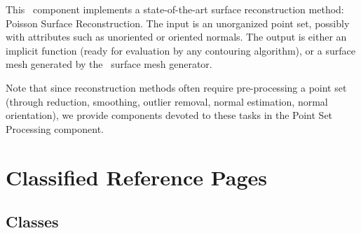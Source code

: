 


This \cgal\ component implements a state-of-the-art surface reconstruction method: Poisson Surface Reconstruction. The input is an unorganized point set, possibly with attributes such as unoriented or oriented normals. The output is either an implicit function (ready for evaluation by any contouring algorithm), or a surface mesh generated by the \cgal\ surface mesh generator.

Note that since reconstruction methods often require pre-processing a point set (through reduction, smoothing, outlier removal, normal estimation, normal orientation), we provide components devoted to these tasks in the Point Set Processing component.

\section{Classified Reference Pages}

\subsection{Classes}

  \\

